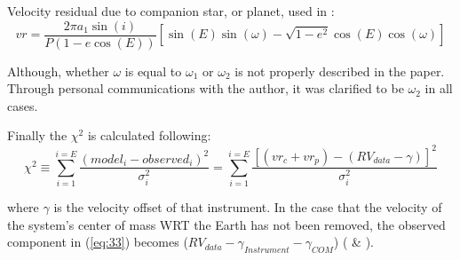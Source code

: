 \documentclass[10pt,preprint]{aastex}
\begin{document}
Velocity residual due to companion star, or planet, used in \citet{Shulze-Hartung}:
\begin{equation}\label{eq:32}
vr = \frac{2\pi a_1 \sin(i)}{P(1-e\cos(E))}[\sin(E)\sin(\omega)-\sqrt{1-e^2}\cos(E)\cos(\omega)]
\end{equation}


Although, whether $\omega$ is equal to $\omega_1$ or $\omega_2$ is not properly described in the paper.  Through personal communications with the author, it was clarified to be $\omega_2$ in all cases.  %

Finally the ${\chi}^{2} $ is calculated following:
\begin{equation}\label{eq:33}
{\chi}^{2} \equiv  \sum_{i=1}^{i=E} \frac{(model_i - observed_i)^{2}}{\sigma^{2}_i} = \sum_{i=1}^{i=E} \frac{[(vr_c+vr_p) - (RV_{data}-\gamma)]^{2}}{\sigma^{2}_i}
\end{equation}

where $\gamma $ is the velocity offset of that instrument.  In the case that the velocity of the system's center of mass WRT the Earth has not been removed, the observed component in (\ref{eq:33}) becomes ($RV_{data}-\gamma_{Instrument}-\gamma_{COM}$) (\citet{Paddock} \& \citet{Shulze-Hartung}).



\pagebreak

\clearpage
\end{document}
